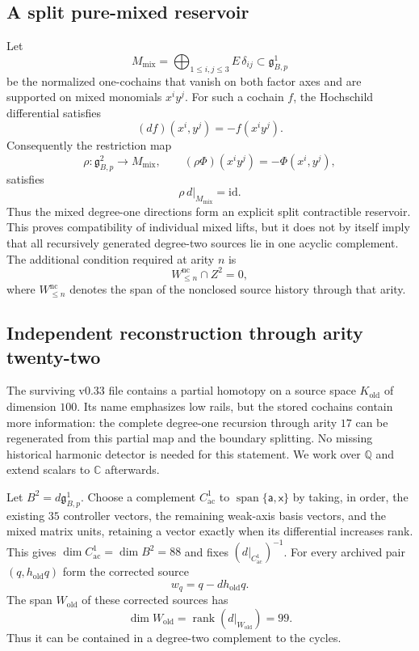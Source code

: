 \documentclass[11pt]{amsart}
\newcommand{\Span}{\operatorname{span}}
\newcommand{\rank}{\operatorname{rank}}
\newcommand{\C}{\mathbb C}
\newcommand{\Q}{\mathbb Q}
\newcommand{\ghoch}{\mathfrak g}
\begin{document}
\subsection{A split pure-mixed reservoir}

Let
\[
M_{\mathrm{mix}}
=
\bigoplus_{1\le i,j\le3}E\,\delta_{ij}
\subset \ghoch^1_{B,p}
\]
be the normalized one-cochains that vanish on both factor axes and are supported on mixed monomials $x^iy^j$.  For such a cochain $f$, the Hochschild differential satisfies
\[
(d f)(x^i,y^j)=-f(x^iy^j).
\]
Consequently the restriction map
\[
\rho:\ghoch^2_{B,p}\longrightarrow M_{\mathrm{mix}},
\qquad
(\rho\Phi)(x^iy^j)=-\Phi(x^i,y^j),
\]
satisfies
\begin{equation}\label{eq:split-mixed}
\boxed{\rho\,d|_{M_{\mathrm{mix}}}=\mathrm{id}.}
\end{equation}
Thus the mixed degree-one directions form an explicit split contractible reservoir.  This proves compatibility of individual mixed lifts, but it does not by itself imply that all recursively generated degree-two sources lie in one acyclic complement.  The additional condition required at arity $n$ is
\[
W_{\le n}^{\mathrm{nc}}\cap Z^2=0,
\]
where $W_{\le n}^{\mathrm{nc}}$ denotes the span of the nonclosed source history through that arity.

\subsection{Independent reconstruction through arity twenty-two}\label{subsec:independent-transfer}

The surviving v0.33 file contains a partial homotopy on a source space
$K_{\mathrm{old}}$ of dimension $100$. Its name emphasizes low rails, but the
stored cochains contain more information: the complete degree-one recursion
through arity $17$ can be regenerated from this partial map and the boundary
splitting. No missing historical harmonic detector is needed for this statement.
We work over $\Q$ and extend scalars to $\C$ afterwards.

Let $B^2=d\ghoch^1_{B,p}$. Choose a complement $C^1_{\mathrm{ac}}$ to
$\Span\{\mathsf a,\mathsf x\}$ by taking, in order, the existing $35$ controller
vectors, the remaining weak-axis basis vectors, and the mixed matrix units,
retaining a vector exactly when its differential increases rank. This gives
$\dim C^1_{\mathrm{ac}}=\dim B^2=88$ and fixes $(d|_{C^1_{\mathrm{ac}}})^{-1}$.
For every archived pair $(q,h_{\mathrm{old}}q)$ form the corrected source
\[
w_q=q-dh_{\mathrm{old}}q.
\]
The span $W_{\mathrm{old}}$ of these corrected sources has
\[
\dim W_{\mathrm{old}}=\rank(d|_{W_{\mathrm{old}}})=99.
\]
Thus it can be contained in a degree-two complement to the cycles.
\end{document}

